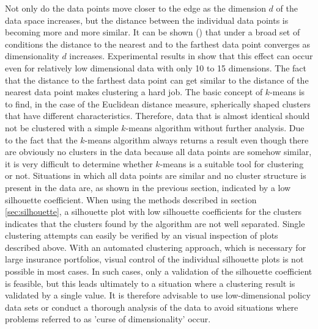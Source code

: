 Not only do the data points move closer to the edge as the dimension $d$ of the data space increases, but the distance between the individual data points is becoming more and more similar. It can be shown (\cite{beyer1999nearest}) that under a broad set of conditions the distance to the nearest and to the farthest data point converges as dimensionality $d$ increases. Experimental results in \cite{beyer1999nearest} show that this effect can occur even for relatively low dimensional data with only 10 to 15 dimensions. The fact that the distance to the farthest data point can get similar to the distance of the nearest data point makes clustering a hard job. The basic concept of $k$-means is to find, in the case of the Euclidean distance measure, spherically shaped clusters that have different characteristics. Therefore, data that is almost identical should not be clustered with a simple $k$-means algorithm without further analysis. Due to the fact that the $k$-means algorithm always returns a result even though there are obviously no clusters in the data because all data points are somehow similar, it is very difficult to determine whether $k$-means is a suitable tool for clustering or not. Situations in which all data points are similar and no cluster structure is present in the data are, as shown in the previous section, indicated by a low silhouette coefficient. When using the methods described in section \ref{sec:silhouette}, a silhouette plot with low silhouette coefficients for the clusters indicates that the clusters found by the algorithm are not well separated. Single clustering attempts can easily be verified by an visual inspection of plots described above. With an automated clustering approach, which is necessary for large insurance portfolios, visual control of the individual silhouette plots is not possible in most cases. In such cases, only a validation of the silhouette coefficient is feasible, but this leads ultimately to a situation where a clustering result is validated by a single value.
It is therefore advisable to use low-dimensional policy data sets or conduct a thorough analysis of the data to avoid situations where problems referred to as 'curse of  dimensionality' occur. 







